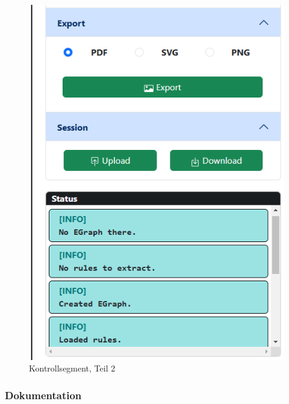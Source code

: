 \begin{figure}
    \begin{center}
      \includegraphics[scale=0.5]{../fig/control2.png}
    \end{center}
    \caption{Kontrollsegment, Teil 2}
    \label{fig:segment32}
\end{figure}



\subsubsection{Dokumentation}







